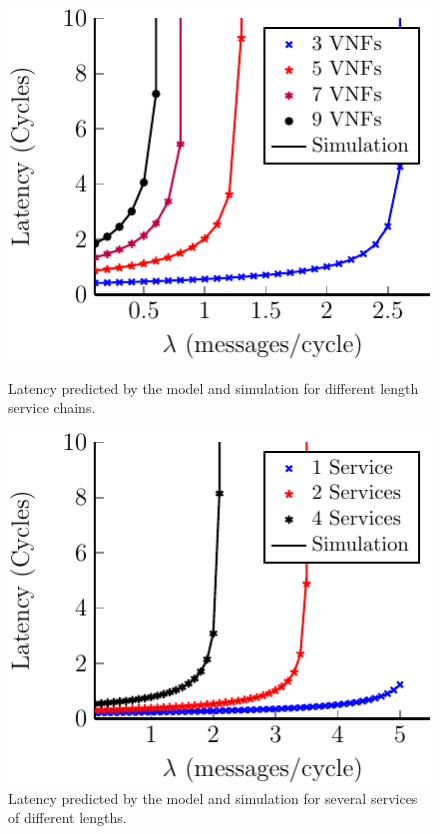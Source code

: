\begin{figure}[bt]
\vspace{10mm}

\begin{minipage}[b]{.48\textwidth}
	\includegraphics[width=\linewidth]{graphs/diff_lengths-crop}
	\caption{Latency predicted by the model and simulation for different length
service chains.}
	\label{fig:length_chain}
\end{minipage}
\hfill
\begin{minipage}[b]{.48\textwidth}
	\includegraphics[width=\linewidth]{graphs/mult_services-crop}
	\caption{Latency predicted by the model and simulation for several services
of different lengths.}
	\label{fig:mult_services}
\end{minipage}

\end{figure}

